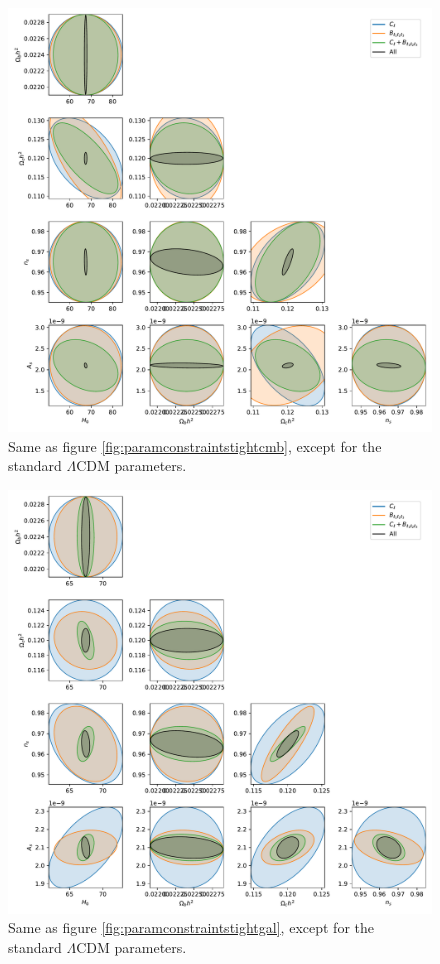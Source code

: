 \documentclass[11pt]{article} %
\begin{document}
\begin{figure}[h!]
    \centering
    \includegraphics[width=\textwidth]{figures/param_constraints_all_cmb.pdf}
    \caption{Same as figure \ref{fig:paramconstraintstightcmb}, except for the standard $\Lambda$CDM parameters.}
    \label{fig:paramconstraintsallcmb}
\end{figure}
\begin{figure}[h!]
    \centering
    \includegraphics[width=\textwidth]{figures/param_constraints_all_gal.pdf}
    \caption{Same as figure \ref{fig:paramconstraintstightgal}, except for the standard $\Lambda$CDM parameters.}
    \label{fig:paramconstraintsallgal}
\end{figure}
\end{document}
